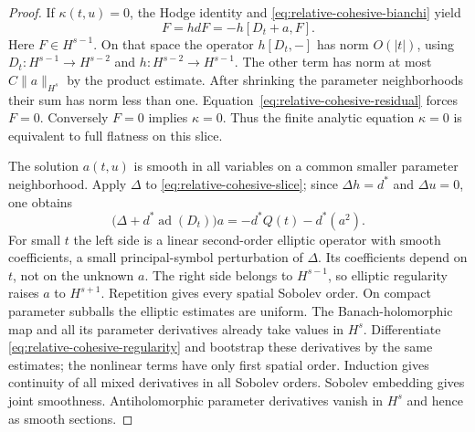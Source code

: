\documentclass[11pt]{article}
\theoremstyle{definition}
\theoremstyle{remark}
\begin{document}
\begin{proof}
If $\kappa(t,u)=0$, the Hodge identity and
\eqref{eq:relative-cohesive-bianchi} yield
\begin{equation}
 F=hdF=-h[D_t+a,F].
 \label{eq:relative-cohesive-residual}
\end{equation}
Here $F\in H^{s-1}$.  On that space the operator $h[D_t,-]$ has
norm $O(|t|)$, using
$D_t:H^{s-1}\to H^{s-2}$ and $h:H^{s-2}\to H^{s-1}$.
The other term has norm at most $C\|a\|_{H^s}$ by the product
estimate.  After shrinking the parameter neighborhoods their sum
has norm less than one.  Equation~\eqref{eq:relative-cohesive-residual}
forces $F=0$.  Conversely $F=0$ implies $\kappa=0$.  Thus the
finite analytic equation $\kappa=0$ is equivalent to full flatness
on this slice.

The solution $a(t,u)$ is smooth in all variables on a common smaller
parameter neighborhood.  Apply $\Delta$ to
\eqref{eq:relative-cohesive-slice}; since $\Delta h=d^*$ and
$\Delta u=0$, one obtains
\begin{equation}
 \bigl(\Delta+d^*\operatorname{ad}(D_t)\bigr)a
             =-d^*Q(t)-d^*(a^2).
 \label{eq:relative-cohesive-regularity}
\end{equation}
For small $t$ the left side is a linear second-order elliptic
operator with smooth coefficients, a small principal-symbol
perturbation of $\Delta$.  Its coefficients depend on $t$, not on
the unknown $a$.  The right side belongs to $H^{s-1}$, so elliptic
regularity raises $a$ to $H^{s+1}$.  Repetition gives every spatial
Sobolev order.  On compact parameter subballs the elliptic estimates
are uniform.  The Banach-holomorphic map and all its parameter
derivatives already take values in $H^s$.  Differentiate
\eqref{eq:relative-cohesive-regularity} and bootstrap these derivatives
by the same estimates; the nonlinear terms have only first spatial
order.  Induction gives continuity of all mixed derivatives in all
Sobolev orders.  Sobolev embedding gives joint smoothness.
Antiholomorphic parameter derivatives vanish in $H^s$ and hence
as smooth sections.


\end{proof}
\end{document}
